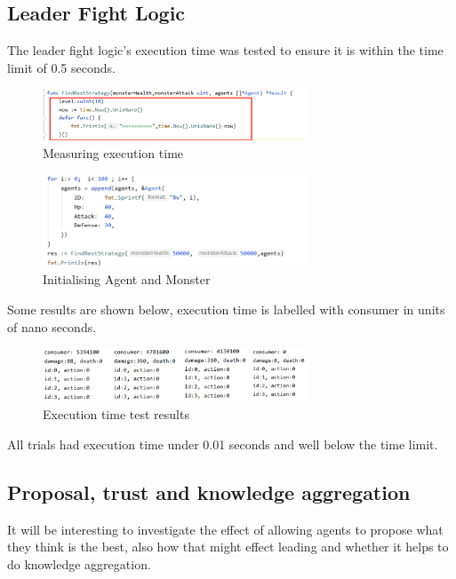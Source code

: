 \subsection{Leader Fight Logic}
The leader fight logic's execution time was tested to ensure it is within the time limit of 0.5 seconds.

\begin{figure}[htb]
    \centering
    \includegraphics[width=0.7\textwidth]{008_team_5_agent_design/images/10.png}
    \caption{Measuring execution time}
    \label{testingexecutiontime}
\end{figure}

\begin{figure}[!ht]
    \centering
    \includegraphics[width=0.7\textwidth]{008_team_5_agent_design/images/11.png}
    \caption{Initialising Agent and Monster}
    \label{initialisingagentandmonster}
\end{figure}

Some results are shown below, execution time is labelled with consumer in units of nano seconds.

\begin{figure}[!ht]
    \centering
    \includegraphics[width=0.7\textwidth]{008_team_5_agent_design/images/12.png}
    \caption{Execution time test results}
    \label{executiontimetestresults}
\end{figure}

All trials had execution time under 0.01 seconds and well below the time limit.

\subsection{Proposal, trust and knowledge aggregation}
It will be interesting to investigate the effect of allowing agents to propose what they think is the best, also how that might effect leading and whether it helps to do knowledge aggregation.

